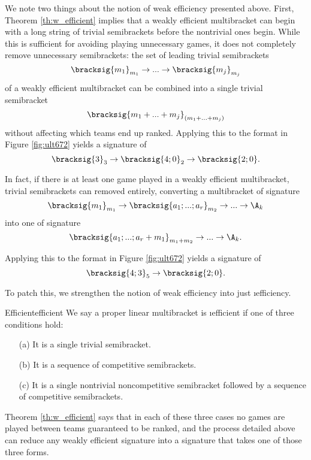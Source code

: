 {    
   

    We note two things about the notion of weak efficiency presented above. First, Theorem \ref{th:w_efficient} implies that a weakly efficient multibracket can begin with a long string of trivial semibrackets before the nontrivial ones begin. While this is sufficient for avoiding playing unnecessary games, it does not completely remove unnecessary semibrackets: the set of leading trivial semibrackets $$\bracksig{m_1}_{m_1} \to ... \to \bracksig{m_{j}}_{m_{j}}$$ of a weakly efficient multibracket can be combined into a single trivial semibracket $$\bracksig{m_1 + ... + m_{j}}_{(m_1 + ... + m_{j})}$$ without affecting which teams end up ranked. Applying this to the format in Figure \ref{fig:ult672} yields a signature of $$\bracksig{3}_3 \to \bracksig{4;0}_2 \to \bracksig{2;0}.$$ 
    
    In fact, if there is at least one game played in a weakly efficient multibracket, trivial semibrackets can removed entirely, converting a multibracket of signature $$\bracksig{m_1}_{m_1} \to \bracksig{a_1; ...; a_r}_{m_2} \to ... \to \A_k$$ into one of signature $$\bracksig{a_1; ...; a_r + m_1}_{m_1 + m_2} \to ... \to \A_k.$$ 
    
    Applying this to the format in Figure \ref{fig:ult672} yields a signature of $$\bracksig{4;3}_5 \to \bracksig{2;0}.$$

    To patch this, we strengthen the notion of weak efficiency into just \i{efficiency.}

    \begin{definition}{Efficient}{efficient}
        We say a proper linear multibracket is \i{efficient} if one of three conditions hold:
        \begin{enumerate}
            \item[(a)] It is a single trivial semibracket.
            \item[(b)] It is a sequence of competitive semibrackets.
            \item[(c)] It is a single nontrivial noncompetitive semibracket followed by a sequence of competitive semibrackets.
        \end{enumerate}
    \end{definition}

    Theorem \ref{th:w_efficient} says that in each of these three cases no games are played between teams guaranteed to be ranked, and the process detailed above can reduce any weakly efficient signature into a signature that takes one of those three forms.

}
